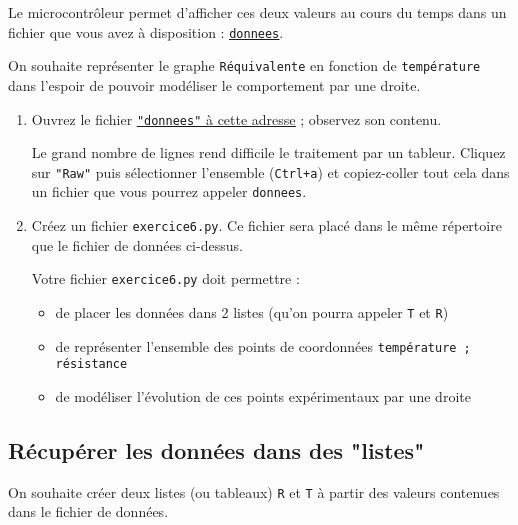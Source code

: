 \documentclass[11pt]{article}
\begin{document}
\medskip

Le microcontrôleur permet d'afficher ces deux valeurs au cours du temps dans un fichier que vous avez à disposition : \href{https://github.com/formationPythonPC-Juin/enonce-donnees/blob/master/donnees}{\underline{\texttt{donnees}}}.

\medskip

On souhaite représenter le graphe \texttt{Réquivalente} en fonction de \texttt{température} dans l'espoir de pouvoir modéliser le comportement par une droite. 


\medskip


\begin{enumerate}
 \item Ouvrez le fichier  \href{https://github.com/formationPythonPC-Juin/enonce-donnees/blob/master/donnees}{\underline{\texttt{"donnees"} à cette adresse}} ; observez son contenu. 
 
 \smallskip
 Le grand nombre de lignes rend difficile le traitement par un tableur. Cliquez sur \texttt{"Raw"} puis sélectionner l'ensemble (\texttt{Ctrl+a}) et copiez-coller tout cela dans un fichier que vous pourrez appeler \texttt{donnees}.
 \item Créez un fichier \texttt{exercice6.py}. Ce fichier sera placé dans le même répertoire que le fichier de données ci-dessus. 
 
 \smallskip
 Votre fichier \texttt{exercice6.py} doit permettre :
 
 
 \begin{itemize}
  \item de placer les données dans 2 listes (qu'on pourra appeler \texttt{T} et \texttt{R})
  \item de représenter l'ensemble des points de coordonnées \texttt{température ; résistance}
  \item de modéliser l'évolution de ces points expérimentaux par une droite
 \end{itemize}

\end{enumerate}



\subsection{Récupérer les données dans des "listes"}


On souhaite créer deux listes (ou tableaux) \texttt{R} et \texttt{T} à partir des valeurs contenues dans le fichier de données.
\end{document}
